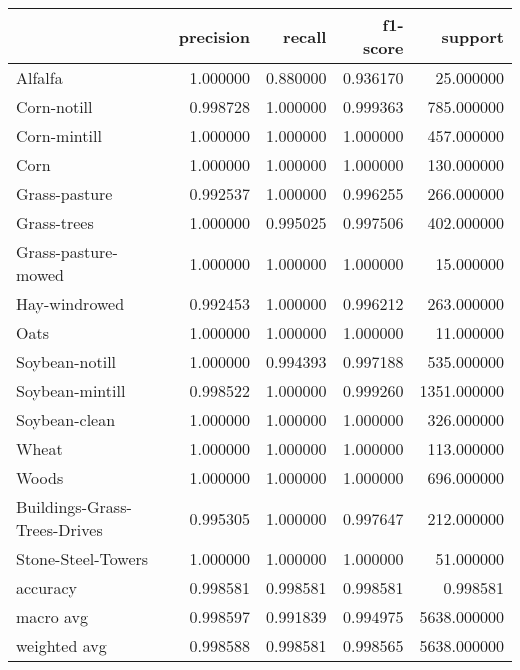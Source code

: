 \begin{tabular}{lrrrr}
\toprule
{} &  precision &    recall &  f1-score &      support \\
\midrule
Alfalfa                      &   1.000000 &  0.880000 &  0.936170 &    25.000000 \\
Corn-notill                  &   0.998728 &  1.000000 &  0.999363 &   785.000000 \\
Corn-mintill                 &   1.000000 &  1.000000 &  1.000000 &   457.000000 \\
Corn                         &   1.000000 &  1.000000 &  1.000000 &   130.000000 \\
Grass-pasture                &   0.992537 &  1.000000 &  0.996255 &   266.000000 \\
Grass-trees                  &   1.000000 &  0.995025 &  0.997506 &   402.000000 \\
Grass-pasture-mowed          &   1.000000 &  1.000000 &  1.000000 &    15.000000 \\
Hay-windrowed                &   0.992453 &  1.000000 &  0.996212 &   263.000000 \\
Oats                         &   1.000000 &  1.000000 &  1.000000 &    11.000000 \\
Soybean-notill               &   1.000000 &  0.994393 &  0.997188 &   535.000000 \\
Soybean-mintill              &   0.998522 &  1.000000 &  0.999260 &  1351.000000 \\
Soybean-clean                &   1.000000 &  1.000000 &  1.000000 &   326.000000 \\
Wheat                        &   1.000000 &  1.000000 &  1.000000 &   113.000000 \\
Woods                        &   1.000000 &  1.000000 &  1.000000 &   696.000000 \\
Buildings-Grass-Trees-Drives &   0.995305 &  1.000000 &  0.997647 &   212.000000 \\
Stone-Steel-Towers           &   1.000000 &  1.000000 &  1.000000 &    51.000000 \\
accuracy                     &   0.998581 &  0.998581 &  0.998581 &     0.998581 \\
macro avg                    &   0.998597 &  0.991839 &  0.994975 &  5638.000000 \\
weighted avg                 &   0.998588 &  0.998581 &  0.998565 &  5638.000000 \\
\bottomrule
\end{tabular}
